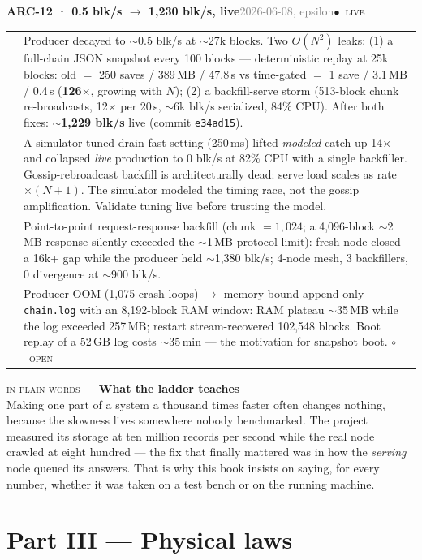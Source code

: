 \documentclass[10pt,a4paper]{article}
\makeatletter
\newcommand{\stO}{\textcolor{sigilamber}{$\circ$}~{\scriptsize\textcolor{sigilamber}{\textsc{open}}}}
\newcommand{\stL}{\textcolor{sigilcyan}{$\bullet$}~{\scriptsize\textcolor{sigilcyan}{\textsc{live}}}}
\newcommand{\measured}[1]{\textcolor{sigilcyan}{\textbf{#1}}}
\newcommand{\layman}[3]{%
\begin{tcolorbox}[enhanced,
  interior style={left color=#1!9,right color=white},
  colframe=#1!45!slate,boxrule=0.5pt,arc=3pt,
  borderline west={2.5pt}{0pt}{#1},
  left=9pt,right=9pt,top=7pt,bottom=7pt]
{\scriptsize\textcolor{#1}{\textsc{in plain words}}\; — \;\textbf{\small #2}}\\[3pt]
\small #3
\end{tcolorbox}}
\newcommand{\frow}[2]{{\footnotesize\textcolor{gray}{\textsc{#1}}}\;&\small #2\\}
\newenvironment{mentry}[4]{%
\begin{tcolorbox}[enhanced,breakable,colback=white,colframe=slate,boxrule=0.6pt,arc=2pt,
  left=8pt,right=8pt,top=6pt,bottom=6pt,
  borderline west={3pt}{0pt}{sigilcyan!70!slate}]
{\small\textbf{#1 · #2}\hfill{\footnotesize\textcolor{gray}{#3}}\quad#4}\\[4pt]
\begin{tabular}{@{}>{\raggedleft\arraybackslash}p{1.8cm}p{13.2cm}@{}}
}{%
\end{tabular}
\end{tcolorbox}\vspace{2pt}}
\makeatother
\begin{document}
\begin{mentry}{ARC-12}{0.5 blk/s $\to$ 1{,}230 blk/s, live}{2026-06-08, epsilon}{\stL}
\frow{measured}{Producer decayed to $\sim$0.5 blk/s at $\sim$27k blocks. Two $O(N^2)$
leaks: (1) a full-chain JSON snapshot every 100 blocks --- deterministic replay at 25k
blocks: old $=$ 250 saves / 389\,MB / 47.8\,s vs time-gated $=$ 1 save / 3.1\,MB / 0.4\,s
(\measured{126$\times$}, growing with $N$); (2) a backfill-serve storm (513-block chunk
re-broadcasts, 12$\times$ per 20\,s, $\sim$6k blk/s serialized, 84\% CPU). After both
fixes: \measured{$\sim$1{,}229 blk/s} live (commit \texttt{e34ad15}).}
\frow{negative}{A simulator-tuned drain-fast setting (250\,ms) lifted \emph{modeled}
catch-up 14$\times$ --- and collapsed \emph{live} production to 0 blk/s at 82\% CPU with a
single backfiller. Gossip-rebroadcast backfill is architecturally dead: serve load scales
as rate$\times(N{+}1)$. The simulator modeled the timing race, not the gossip
amplification. Validate tuning live before trusting the model.}
\frow{fix}{Point-to-point request-response backfill (chunk $=1{,}024$; a 4{,}096-block
$\sim$2\,MB response silently exceeded the $\sim$1\,MB protocol limit): fresh node closed a
16k+ gap while the producer held $\sim$1{,}380 blk/s; 4-node mesh, 3 backfillers, 0
divergence at $\sim$900 blk/s.}
\frow{follow-ups}{Producer OOM (1{,}075 crash-loops) $\to$ memory-bound append-only
\texttt{chain.log} with an 8{,}192-block RAM window: RAM plateau $\sim$35\,MB while the log
exceeded 257\,MB; restart stream-recovered 102{,}548 blocks. Boot replay of a 52\,GB log
costs $\sim$35\,min --- the motivation for snapshot boot. \stO}
\end{mentry}

\layman{sigilblue}{What the ladder teaches}{
Making one part of a system a thousand times faster often changes nothing, because the
slowness lives somewhere nobody benchmarked. The project measured its storage at ten
million records per second while the real node crawled at eight hundred --- the fix that
finally mattered was in how the \emph{serving} node queued its answers. That is why this
book insists on saying, for every number, whether it was taken on a test bench or on the
running machine.}

\section{Part III --- Physical laws}
\label{sec:laws}
\end{document}
